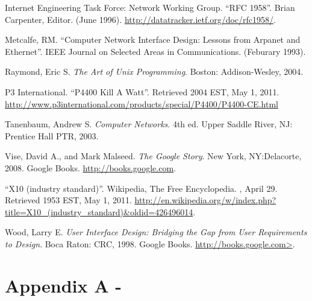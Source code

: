 \documentclass[12pt]{article}
\begin{document}
\renewcommand{\refname}{\section{References}}
\begin{thebibliography}{10}

 Internet Engineering Task Force: Network Working Group.
  \newblock ``RFC 1958''.
  \newblock Brian Carpenter, Editor.
  \newblock (June 1996).
  \newblock \url{http://datatracker.ietf.org/doc/rfc1958/}.

 Metcalfe, RM.
  \newblock ``Computer Network Interface Design: Lessons from
  Arpanet and Ethernet''.
  \newblock IEEE Journal on Selected Areas in Communications.
  \newblock (Feburary 1993).

 Raymond, Eric S.
  \newblock \emph{The Art of Unix Programming}.
  \newblock Boston: Addison-Wesley, 2004.

 P3 International.
  \newblock ``P4400 Kill A Watt''.
  \newblock Retrieved 2004 EST, May 1, 2011.
  \newblock \url{http://www.p3international.com/products/special/P4400/P4400-CE.html}

 Tanenbaum, Andrew S.
  \newblock \emph{Computer Networks}. 4th ed.
  \newblock Upper Saddle River, NJ: Prentice Hall PTR, 2003.

 Vise, David A., and Mark Malseed.
  \newblock \emph{The Google Story}.
  \newblock New York, NY:Delacorte, 2008.
  \newblock Google Books.
  \newblock \url{http://books.google.com}.

 ``X10 (industry standard)''.
  \newblock Wikipedia, The Free Encyclopedia.
  , April 29.  Retrieved 1953 EST, May 1, 2011.
  \newblock \url{http://en.wikipedia.org/w/index.php?title=X10_(industry_standard)&oldid=426496014}.

 Wood, Larry E.
  \newblock \emph{User Interface Design: Bridging the Gap from User
    Requirements to Design}.
  \newblock Boca Raton: CRC, 1998.
  \newblock Google Books.
  \newblock \url{http://books.google.com>}.

\end{thebibliography}


\pagebreak

\section{Appendix A - }

\pagebreak
\end{document}
